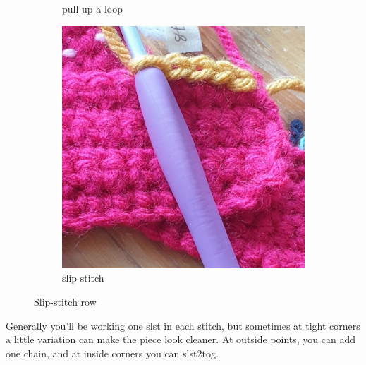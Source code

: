 \documentclass[openany]{book}
\begin{document}
\begin{figure}[H]
\begin{subfigure}[t]{.3\textwidth}
\caption{pull up a loop}
\end{subfigure}
%
\begin{subfigure}[t]{.3\textwidth}
		\centering
		\includegraphics[width=.95\textwidth]{bk/slst3}
\caption{slip stitch}
\end{subfigure}
\caption{Slip-stitch row}
\end{figure}

Generally you'll be working one slst in each stitch, but sometimes at tight corners a little variation can make the piece look cleaner. At outside points, you can add one chain, and at inside corners you can slst2tog.
\end{document}

